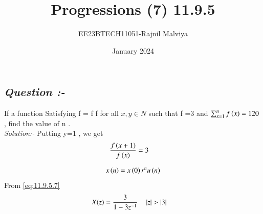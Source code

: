 \documentclass[journal,12pt,twocolumn]{IEEEtran}
\theoremstyle{remark}
\begin{document}
\title{Progressions (7) 11.9.5}
\author{EE23BTECH11051-Rajnil Malviya}
\date{January 2024}
\maketitle
\subsection*{\textit{Question :-}}
If a function Satisfying f = f f for all $x,y \in {N}$ such that f =3 and $\sum_{x=1}^{n} f\left(x\right) = 120$ , find the value of n .\\
\textit{Solution:- }
Putting y=1 , we get
\begin{align}
    \frac{f\left(x+1\right)}{f\left(x\right)}&=3
\end{align}
\begin{table}[h!]
            
    \end{table}
\begin{align}
x \left(n\right) = x \left(0\right)r^{n}u\left(n\right)
\label{eq:11.9.5.7}
\end{align}
From \eqref{eq:11.9.5.7}
\begin{align}
X(z) &=\frac{3}{1-3z^{-1}} \quad \left\vert z\right\vert > \left\vert3\right\vert
\end{align}
\end{document}

